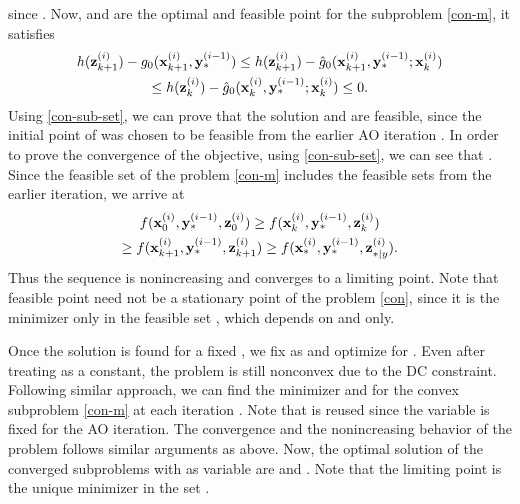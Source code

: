 since . Now,  and  are the optimal and feasible point for the  subproblem \eqref{con-m}, it satisfies
\begin{multline}\label{con-sub-set}
h(\iter{\mz}{k+1}{i}) - {g}_0(\iter{\mx}{k+1}{i},\iter{\my}{\ast}{i-1}) \leq h(\iter{\mz}{k+1}{i}) - \hat{g}_0(\iter{\mx}{k+1}{i},\iter{\my}{\ast}{i-1};\iter{\mx}{k}{i}) \\
\leq h(\iter{\mz}{k}{i}) - \hat{g}_0(\iter{\mx}{k}{i},\iter{\my}{\ast}{i-1};\iter{\mx}{k}{i}) \leq 0. 
\end{multline}
Using \eqref{con-sub-set}, we can prove that the solution  and  are feasible, since the initial point of  was chosen to be feasible from the earlier \ac{AO} iteration . In order to prove the convergence of the objective, using \eqref{con-sub-set}, we can see that . Since the feasible set of the problem \eqref{con-m} includes the feasible sets from the earlier iteration, we arrive at
\begin{multline} \label{con-convergence}
f(\iter{\mx}{0}{i},\iter{\my}{\ast}{i-1},\iter{\mz}{0}{i}) \geq f(\iter{\mx}{k}{i},\iter{\my}{\ast}{i-1},\iter{\mz}{k}{i}) \\ \geq f(\iter{\mx}{k+1}{i},\iter{\my}{\ast}{i-1},\iter{\mz}{k+1}{i}) \geq f(\iter{\mx}{\ast}{i},\iter{\my}{\ast}{i-1},\iter{\mz}{\ast|y}{i}). 
\end{multline}
Thus the sequence  is nonincreasing and converges to a limiting point. Note that feasible point  need not be a stationary point of the problem \eqref{con}, since it is the minimizer only in the feasible set , which depends on \me{\mx} and \me{\mz} only.

Once the solution is found for a fixed \me{\my}, we fix \me{\mx} as  and optimize for \me{\my}. Even after treating \me{\mx} as a constant, the problem is still nonconvex due to the \ac{DC} constraint. Following similar approach, we can find the minimizer  and  for the convex subproblem \eqref{con-m} at each iteration . Note that  is reused since the variable \me{\mx} is fixed for the  \ac{AO} iteration. The convergence and the nonincreasing behavior of the problem follows similar arguments as above. Now, the optimal solution of the converged subproblems with \me{\my} as variable are  and . Note that the limiting point  is the unique minimizer in the set .

